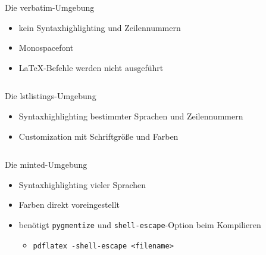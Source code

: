 \documentclass[presentation,aspectratio=169]{beamer}
\begin{document}
\begin{frame}[fragile]{Die verbatim-Umgebung}
  \begin{itemize}
    \item kein Syntaxhighlighting und Zeilennummern
    \item Monospacefont
    \item \LaTeX-Befehle werden nicht ausgeführt
  \end{itemize}
  \begin{minipage}{.4\textwidth}
    
  \end{minipage}
  \hfill
  \begin{minipage}{.5\textwidth}
    \inputminted{latex}{codebeispiele/listings-verbatim.tex}
  \end{minipage}
\end{frame}

\begin{frame}[fragile]{Die lstlistings-Umgebung}
  \begin{itemize}
    \item Syntaxhighlighting bestimmter Sprachen und Zeilennummern
    \item Customization mit Schriftgröße und Farben
  \end{itemize}
  \begin{minipage}{.4\textwidth}
    
  \end{minipage}
  \hfill
  \begin{minipage}{.5\textwidth}
    \inputminted{latex}{codebeispiele/listings-lstlistings.tex}
  \end{minipage}
\end{frame}

\begin{frame}[fragile]{Die minted-Umgebung}
  \begin{itemize}
    \item Syntaxhighlighting vieler Sprachen
    \item Farben direkt voreingestellt
    \item benötigt \verb|pygmentize| und \verb|shell-escape|-Option beim Kompilieren
      \begin{itemize}
        \item \verb|pdflatex -shell-escape <filename>|
      \end{itemize}
  \end{itemize}
  \begin{minipage}{.4\textwidth}
    
  \end{minipage}
  \hfill
  \begin{minipage}{.5\textwidth}
    \inputminted{latex}{codebeispiele/listings-minted.tex}
  \end{minipage}
\end{frame}
\end{document}
